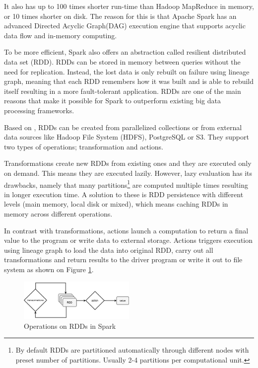 It also has up to 100 times shorter run-time than Hadoop MapReduce in memory, or 10 times shorter on disk. The reason for this is that Apache Spark has an advanced Directed Acyclic Graph(DAG) execution engine that supports acyclic data flow and in-memory computing.\cite{spark}

To be more efficient, Spark also offers an abstraction called resilient distributed data set (RDD). RDDs can be stored in memory between queries without the need for replication. Instead, the lost data is only rebuilt on failure using lineage graph, meaning that each RDD remembers how it was built and is able to rebuild itself resulting in a more fault-tolerant application. RDDs are one of the main reasons that make it possible for Spark to outperform existing big data processing frameworks. \cite{spark}

Based on \cite{spark:rdds}, RDDs can be created from parallelized collections or from external data sources like Hadoop File System (HDFS), PostgreSQL or S3. They support two types of operations; transformation and actions.

Transformations create new RDDs from existing ones and they are executed only on demand. This means they are executed lazily. However, lazy evaluation has its drawbacks, namely that many partitions\footnote{By default RDDs are partitioned automatically  through different nodes with preset number of partitions. Usually 2-4 partitions per computational unit.} are computed multiple times resulting in longer execution time. A solution to these is RDD persistence with different levels (main memory, local disk or mixed), which means caching RDDs in memory across different operations. 
 
In contrast with transformations, actions launch a computation to return a final value to the program or write data to external storage. Actions triggers execution using lineage graph to load the data into original RDD, carry out all transformations and return  results to the driver program or write it out to file system as shown on Figure \ref{fig:spark-ops}.

\begin{figure}[h]
    \centering
    \includegraphics[width=0.5\textwidth]{images/operations_spark.png}
    \caption{Operations on RDDs in Spark}
    \label{fig:spark-ops}
\end{figure}

